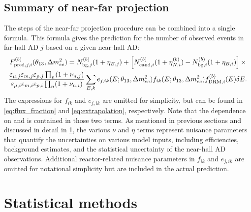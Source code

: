 
\subsection{Summary of near-far projection}
\label{subsec:model_summary}

The steps of the near-far projection procedure can be combined into a single formula.
This formula gives the prediction for the number of observed events
in far-hall AD $j$ based on a given near-hall AD:
\begin{multline}\label{eq:full_prediction}
    F_{\text{pred},j,i}^{(b)}(\theta_{13},\Delta m^2_{ee}) =
    N_{\text{bg},j}^{(b)}(1 + \eta_{B,j}) +
    \left[N_{\text{cand},i}^{(b)}(1 + \eta_{N,i}^{(b)}) - N_{\text{bg},i}^{(b)}
    (1 + \eta_{B,i})\right] \times \\
    \frac{
        \varepsilon_{\mu,j}\varepsilon_{m,j}\varepsilon_{p,j}
        \prod_n(1 + \nu_{n,j})
    }{
        \varepsilon_{\mu,i}\varepsilon_{m,i}\varepsilon_{p,i}\prod_n(1+\nu_{n,i})
    }
        \sum_{E,k}
        e_{j,ik}(E; \theta_{13},\Delta m^2_{ee}) f_{ik}(E; \theta_{13},\Delta m^2_{ee})
        f_{\text{DRM},i}^{(b)}(E) \delta E.
\end{multline}
The expressions for $f_{ik}$ and $e_{j,ik}$ are omitted for simplicity,
but can be found in \cref{eq:flux_fraction} and \cref{eq:extrapolation}, respectively.
Note that the dependence on \thetaot{} and \dmee{} is contained in those two terms.
As mentioned in previous sections and discussed in detail in \cref{sec:fitter},
the various $\nu$ and $\eta$ terms represent nuisance parameters
that quantify the uncertainties on various model inputs,
including efficiencies, background estimates,
and the statistical uncertainty of the near-hall AD observations.
Additional reactor-related nuisance parameters in $f_{ik}$ and $e_{j,ik}$ are omitted
for notational simplicity but are included in the actual prediction.

\section{Statistical methods}
\label{sec:fitter}

